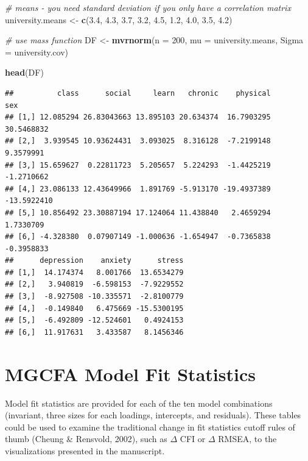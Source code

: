 \documentclass[
  man]{apa7}
\newenvironment{Shaded}{\begin{snugshade}}{\end{snugshade}}
\newcommand{\AttributeTok}[1]{\textcolor[rgb]{0.13,0.29,0.53}{#1}}
\newcommand{\CommentTok}[1]{\textcolor[rgb]{0.56,0.35,0.01}{\textit{#1}}}
\newcommand{\DecValTok}[1]{\textcolor[rgb]{0.00,0.00,0.81}{#1}}
\newcommand{\FloatTok}[1]{\textcolor[rgb]{0.00,0.00,0.81}{#1}}
\newcommand{\FunctionTok}[1]{\textcolor[rgb]{0.13,0.29,0.53}{\textbf{#1}}}
\newcommand{\NormalTok}[1]{#1}
\newcommand{\OtherTok}[1]{\textcolor[rgb]{0.56,0.35,0.01}{#1}}
\begin{document}
\begin{Shaded}
\begin{Highlighting}[]
\CommentTok{\# means {-} you need standard deviation if you only have a correlation matrix }
\NormalTok{university.means }\OtherTok{\textless{}{-}} \FunctionTok{c}\NormalTok{(}\FloatTok{3.4}\NormalTok{, }\FloatTok{4.3}\NormalTok{, }\FloatTok{3.7}\NormalTok{, }\FloatTok{3.2}\NormalTok{, }\FloatTok{4.5}\NormalTok{, }\FloatTok{1.2}\NormalTok{, }\FloatTok{4.0}\NormalTok{, }\FloatTok{3.5}\NormalTok{, }\FloatTok{4.2}\NormalTok{)}

\CommentTok{\# use mass function}
\NormalTok{DF }\OtherTok{\textless{}{-}} \FunctionTok{mvrnorm}\NormalTok{(}\AttributeTok{n =} \DecValTok{200}\NormalTok{, }\AttributeTok{mu =}\NormalTok{ university.means, }\AttributeTok{Sigma =}\NormalTok{ university.cov)}

\FunctionTok{head}\NormalTok{(DF)}
\end{Highlighting}
\end{Shaded}

\normalsize

\begin{verbatim}
##          class      social     learn   chronic    physical         sex
## [1,] 12.085294 26.83043663 13.895103 20.634374  16.7903295  30.5468832
## [2,]  3.939545 10.93624431  3.093025  8.316128  -7.2199148   9.3579991
## [3,] 15.659627  0.22811723  5.205657  5.224293  -1.4425219  -1.2710662
## [4,] 23.086133 12.43649966  1.891769 -5.913170 -19.4937389 -13.5922410
## [5,] 10.856492 23.30887194 17.124064 11.438840   2.4659294   1.7330709
## [6,] -4.328380  0.07907149 -1.000636 -1.654947  -0.7365838  -0.3958833
##      depression    anxiety      stress
## [1,]  14.174374   8.001766  13.6534279
## [2,]   3.940819  -6.598153  -7.9229552
## [3,]  -8.927508 -10.335571  -2.8100779
## [4,]  -0.149840   6.475669 -15.5300195
## [5,]  -6.492809 -12.524601   0.4924153
## [6,]  11.917631   3.433587   8.1456346
\end{verbatim}

\hypertarget{mgcfa-model-fit-statistics}{%
\section{MGCFA Model Fit Statistics}\label{mgcfa-model-fit-statistics}}

Model fit statistics are provided for each of the ten model combinations (invariant, three sizes for each loadings, intercepts, and residuals). These tables could be used to examine the traditional change in fit statistics cutoff rules of thumb (Cheung \& Rensvold, 2002), such as \(\Delta\) CFI or \(\Delta\) RMSEA, to the visualizations presented in the manuscript.
\end{document}
